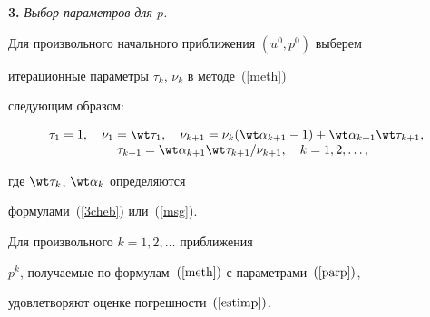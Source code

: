 {\bf 3.} {\it Выбор параметров для $p$.}


Для произвольного начального приближения $(u^0,p^0)$ выберем


итерационные параметры $\tau_k$, $\nu_k$ в методе~(\ref{meth})


следующим образом:


\begin{equation}


\label{parp}


\begin{array}{c}


\tau_1 = 1, \quad \nu_1 = \wt \tau_{1}, \quad


\nu_{k+1}=\nu_k (\wt \alpha_{k+1} -1 ) + \wt \alpha_{k+1} \wt \tau_{k+1}, \\


\quad \tau_{k+1} = \wt \alpha_{k+1} \wt \tau_{k+1} / \nu_{k+1},


\quad k = 1, 2, \dotsc,


\end{array}


\end{equation}


где $\wt \tau_{k}$, $\wt \alpha_{k}$ определяются


формулами~(\ref{3cheb}) или~(\ref{msg}).





\begin{thm} Для произвольного $k = 1, 2, \dotsc$ приближения


$p^k$, получаемые по формулам~$(\ref{meth})$ с параметрами~$(\ref{parp})$,


удовлетворяют оценке погрешности~$(\ref{estimp})$.


\end{thm}





